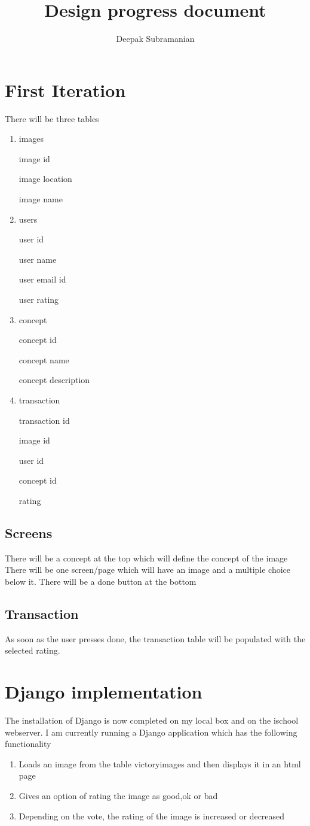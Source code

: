 \documentclass{article}
\begin{document}
\title{Design progress document}
\author{Deepak Subramanian}
\maketitle
\section{First Iteration}
There will be three tables
\begin{enumerate}
\item
images 

image id 

image location 

image name
\item
users 

user id 

user name 

user email id 

user rating
\item
concept

concept id

concept name

concept description

\item
transaction 

transaction id 

image id 

user id 

concept id

rating
\end{enumerate}

\subsection {Screens}
There will be a concept at the top which will define the concept of the image
There will be one screen/page which will have an image and a multiple choice below it.
There will be a done button at the bottom
\subsection {Transaction}
As soon as the user presses done, the transaction table will be populated with the selected rating.
\section{Django implementation}
The installation of Django is now completed on my local box and on the ischool webserver.
I am currently running a Django application which has the following functionality
\begin{enumerate}
\item
Loads an image from the table victoryimages and then displays it in an html page
\item
Gives an option of rating the image as good,ok or bad
\item
Depending on the vote, the rating of the image is increased or decreased
\end{enumerate}
\end{document}
